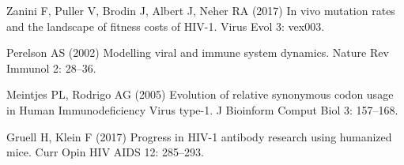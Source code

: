 \documentclass[aps,prx,noshowpacs,twocolumn,nofootinbib]{revtex4-2}
\begin{document}
\begin{thebibliography}{10}
Zanini F, Puller V, Brodin J, Albert J, Neher RA (2017) {In vivo mutation rates
  and the landscape of fitness costs of HIV-1.}
\newblock Virus Evol 3: vex003.

Perelson AS (2002) {Modelling viral and immune system dynamics.}
\newblock Nature Rev Immunol 2: 28--36.

Meintjes PL, Rodrigo AG (2005) {Evolution of relative synonymous codon usage in
  Human Immunodeficiency Virus type-1.}
\newblock J Bioinform Comput Biol 3: 157--168.

Gruell H, Klein F (2017) { Progress in HIV-1 antibody research using humanized
  mice.}
\newblock Curr Opin HIV AIDS 12: 285--293.

\end{thebibliography}
\end{document}
